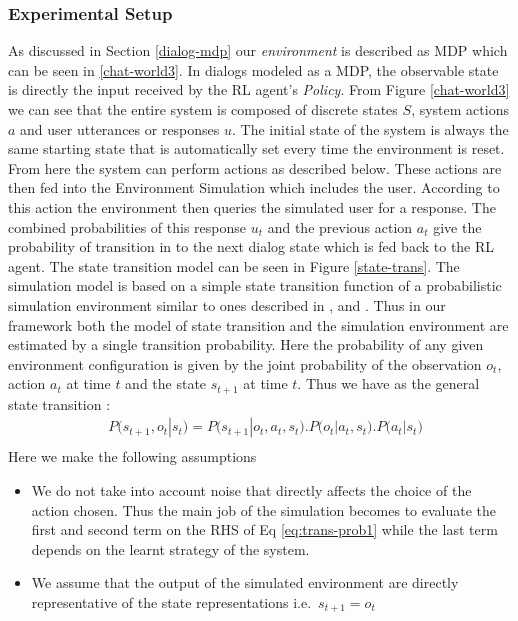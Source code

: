 \documentclass[14pt]{extarticle}
\numberwithin{equation}{section}
\begin{document}
	\subsubsection{Experimental Setup}\label{expt-setup}
	As discussed in Section \ref{dialog-mdp} our \textit{environment} is described as MDP which can be seen in \ref{chat-world3}. In dialogs modeled as a MDP, the observable state is directly the input received by the RL agent's \textit{Policy}. From Figure \ref{chat-world3} we can see that the entire system is composed of discrete states $S$, system actions $a$ and user utterances or responses $u$. The initial state of the system is always the same starting state that is automatically set every time the environment is reset. From here the system can perform actions as described below. These actions are then fed into the Environment Simulation which includes the user. According to this action the environment then queries the simulated user for a response. The combined probabilities of this response $u_t$	and the previous action $a_t$ give the probability of transition in to the next dialog state which is fed back to the RL agent. The state transition model can be seen in Figure \ref{state-trans}. The simulation model is based on a simple state transition function of a probabilistic simulation environment similar to ones described in \cite{Singh_mdp}, \cite{walker2000evaluation} and \cite{roy2000spoken}. Thus in our framework both the model of state transition and the simulation environment are estimated by a single transition probability. Here the probability of any given environment configuration is given by the joint probability of the observation $o_t$, action $a_t$ at time $t$ and the state $s_{t+1}$ at time $t$. Thus we have as the general state transition :
	\begin{align}\label{eq:trans-prob1}
	&P\big(s_{t+1},o_t | s_t\big) = P\big(s_{t+1} | o_t,a_t,s_t \big).P\big(o_t | a_t,s_t\big).P\big(a_t | s_t\big) \nonumber\\
	\end{align}
	Here we make the following assumptions
	\begin{itemize}
		\item We do not take into account noise that directly affects the choice of the action chosen. Thus the main job of the simulation becomes to evaluate the first and second term on the RHS of Eq \ref{eq:trans-prob1} while the last term depends on the learnt strategy of the system.
		\item We assume that the output of the simulated environment are directly representative of the state representations i.e.\ $s_{t+1} = o_t$
	\end{itemize}
\end{document}
